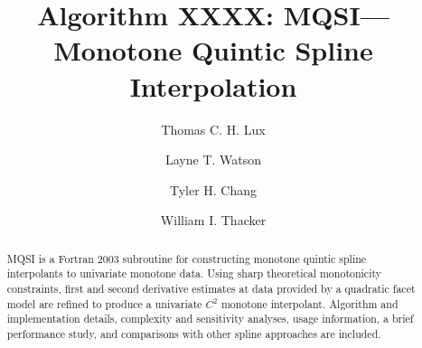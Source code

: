 \documentclass[manuscript]{acmart}
\begin{document}
\title{Algorithm XXXX: MQSI---Monotone Quintic Spline Interpolation}

\author{Thomas C. H. Lux}
\author{Layne T. Watson}

\author{Tyler H. Chang}

\author{William I. Thacker}

\renewcommand{\shortauthors}{Lux et al.}

\begin{abstract}
  MQSI is a Fortran 2003 subroutine for constructing monotone quintic
  spline interpolants to univariate monotone data. Using sharp
  theoretical monotonicity constraints, first and second derivative
  estimates at data provided by a quadratic facet model are refined to
  produce a univariate $\scriptstyle C^2$ monotone interpolant.
  Algorithm and implementation details, complexity and sensitivity
  analyses, usage information, a brief performance study, and
  comparisons with other spline approaches are included.
\end{abstract}
\end{document}
